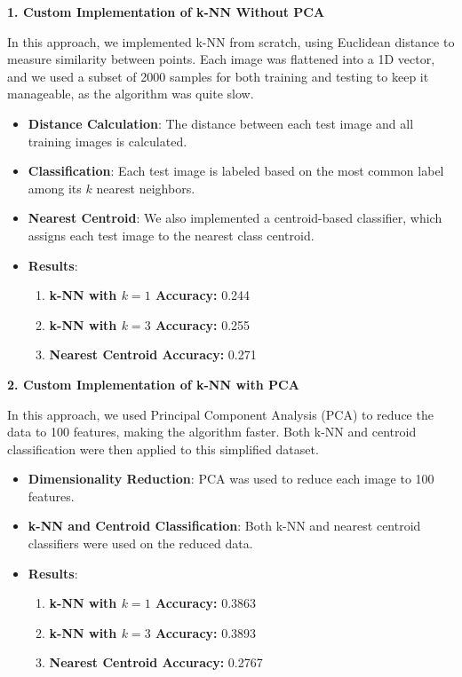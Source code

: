 \documentclass[lettersize,journal]{IEEEtran}
\begin{document}
\textbf{1. Custom Implementation of k-NN Without PCA}

In this approach, we implemented k-NN from scratch, using Euclidean distance to measure similarity between points. Each image was flattened into a 1D vector, and we used a subset of 2000 samples for both training and testing to keep it manageable, as the algorithm was quite slow.

\begin{itemize}
    \item \textbf{Distance Calculation}: The distance between each test image and all training images is calculated.
    \item \textbf{Classification}: Each test image is labeled based on the most common label among its \( k \) nearest neighbors.
    \item \textbf{Nearest Centroid}: We also implemented a centroid-based classifier, which assigns each test image to the nearest class centroid.
    \item \textbf{Results}:
    \begin{enumerate}
        \item \textbf{k-NN with \( k = 1 \) Accuracy:} 0.244
        \item \textbf{k-NN with \( k = 3 \) Accuracy:} 0.255
        \item \textbf{Nearest Centroid Accuracy:} 0.271
    \end{enumerate}
\end{itemize}

\vspace{0.3cm}

\textbf{2. Custom Implementation of k-NN with PCA}

In this approach, we used Principal Component Analysis (PCA) to reduce the data to 100 features, making the algorithm faster. Both k-NN and centroid classification were then applied to this simplified dataset.

\begin{itemize}
    \item \textbf{Dimensionality Reduction}: PCA was used to reduce each image to 100 features.
    \item \textbf{k-NN and Centroid Classification}: Both k-NN and nearest centroid classifiers were used on the reduced data.
    \item \textbf{Results}:
    \begin{enumerate}
        \item \textbf{k-NN with \( k = 1 \) Accuracy:} 0.3863
        \item \textbf{k-NN with \( k = 3 \) Accuracy:} 0.3893
        \item \textbf{Nearest Centroid Accuracy:} 0.2767
    \end{enumerate}
\end{itemize}
\end{document}
